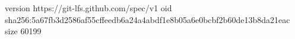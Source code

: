 version https://git-lfs.github.com/spec/v1
oid sha256:5a67fb3d2586af55cffeedb6a24a4abdf1e8b05a6e0bcbf2b60de13b8da21eac
size 60199
